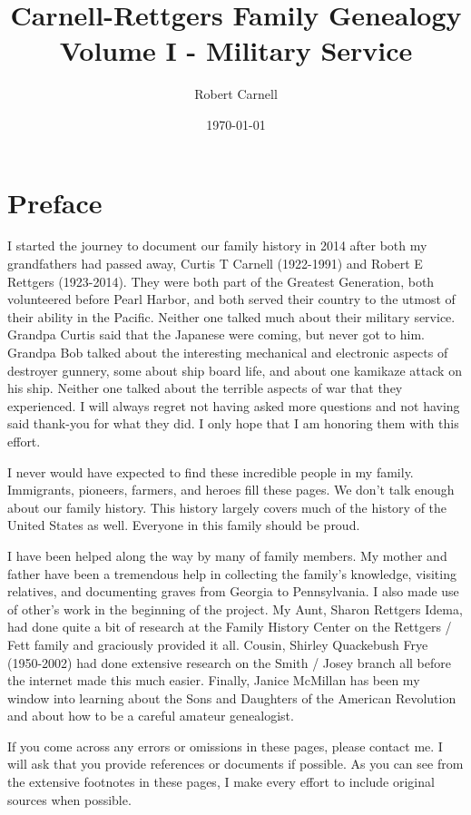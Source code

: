 \documentclass[11pt,letter]{book}
\title{\bf Carnell-Rettgers Family Genealogy \\
       \large Volume I - Military Service}
\author{Robert Carnell}
\date{\today}
\begin{document}
\frontmatter
\maketitle
\chapter{Preface}

I started the journey to document our family history in 2014 after both my grandfathers had passed away, Curtis T Carnell (1922-1991) and Robert E Rettgers (1923-2014).  They were both part of the Greatest Generation, both volunteered before Pearl Harbor, and both served their country to the utmost of their ability in the Pacific.  Neither one talked much about their military service.  Grandpa Curtis said that the Japanese were coming, but never got to him.  Grandpa Bob talked about the interesting mechanical and electronic aspects of destroyer gunnery, some about ship board life, and about one kamikaze attack on his ship.  Neither one talked about the terrible aspects of war that they experienced.  I will always regret not having asked more questions and not having said thank-you for what they did.  I only hope that I am honoring them with this effort.  

I never would have expected to find these incredible people in my family.  Immigrants, pioneers, farmers, and heroes fill these pages.  We don't talk enough about our family history.  This history largely covers much of the history of the United States as well.  Everyone in this family should be proud.

I have been helped along the way by many of family members.  My mother and father have been a tremendous help in collecting the family's knowledge, visiting relatives, and documenting graves from Georgia to Pennsylvania.  I also made use of other's work in the beginning of the project.  My Aunt, Sharon Rettgers Idema, had done quite a bit of research at the Family History Center on the Rettgers / Fett family and graciously provided it all.  Cousin, Shirley Quackebush Frye (1950-2002) had done extensive research on the Smith / Josey branch all before the internet made this much easier.  Finally, Janice McMillan has been my window into learning about the Sons and Daughters of the American Revolution and about how to be a careful amateur genealogist.

If you come across any errors or omissions in these pages, please contact me.  I will ask that you provide references or documents if possible.  As you can see from the extensive footnotes in these pages, I make every effort to include original sources when possible.
\end{document}
